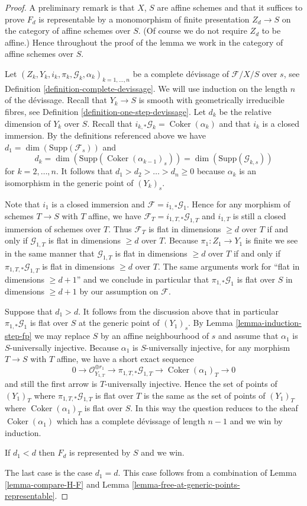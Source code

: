 \documentclass[10pt,a4paper]{amsart}
\theoremstyle{plain}
\theoremstyle{definition}
\theoremstyle{remark}
\numberwithin{equation}{subsection}
\def\Coker{\mathop{\mathrm{Coker}}}
\begin{document}
\begin{proof}
A preliminary remark is that $X$, $S$ are affine schemes and that it
suffices to prove $F_d$ is representable by a monomorphism of finite
presentation $Z_d \to S$ on the category of affine schemes over $S$.
(Of course we do not require $Z_d$ to be affine.)
Hence throughout the proof of
the lemma we work in the category of affine schemes over $S$.

\medskip\noindent
Let $(Z_k, Y_k, i_k, \pi_k, \mathcal{G}_k, \alpha_k)_{k = 1, \ldots, n}$
be a complete d\'evissage of $\mathcal{F}/X/S$ over $s$, see
Definition \ref{definition-complete-devissage}.
We will use induction on the length $n$ of the d\'evissage.
Recall that $Y_k \to S$ is smooth with geometrically irreducible fibres, see
Definition \ref{definition-one-step-devissage}.
Let $d_k$ be the relative dimension of $Y_k$ over $S$.
Recall that $i_{k, *}\mathcal{G}_k = \Coker(\alpha_k)$ and
that $i_k$ is a closed immersion.
By the definitions referenced above we have
$d_1 = \dim(\text{Supp}(\mathcal{F}_s))$ and
$$
d_k = \dim(\text{Supp}(\Coker(\alpha_{k - 1})_s))
= \dim(\text{Supp}(\mathcal{G}_{k, s}))
$$
for $k = 2, \ldots, n$. It follows that $d_1 > d_2 > \ldots > d_n \geq 0$
because $\alpha_k$ is an isomorphism in the generic point of $(Y_k)_s$.

\medskip\noindent
Note that $i_1$ is a closed immersion and
$\mathcal{F} = i_{1, *}\mathcal{G}_1$.
Hence for any morphism of schemes $T \to S$ with $T$ affine,
we have $\mathcal{F}_T = i_{1, T, *}\mathcal{G}_{1, T}$ and
$i_{1, T}$ is still a closed immersion of schemes over $T$.
Thus $\mathcal{F}_T$ is flat in dimensions $\geq d$ over $T$
if and only if $\mathcal{G}_{1, T}$ is flat in dimensions $\geq d$ over $T$.
Because $\pi_1 : Z_1 \to Y_1$ is finite we see in the same manner that
$\mathcal{G}_{1, T}$ is flat in dimensions $\geq d$ over $T$
if and only if $\pi_{1, T, *}\mathcal{G}_{1, T}$ is flat in dimensions
$\geq d$ over $T$. The same arguments work for
``flat in dimensions $\geq d + 1$'' and we conclude in particular that
$\pi_{1, *}\mathcal{G}_1$ is flat over $S$ in dimensions $\geq d + 1$
by our assumption on $\mathcal{F}$.

\medskip\noindent
Suppose that $d_1 > d$. It follows from the discussion above that
in particular $\pi_{1, *}\mathcal{G}_1$ is flat over $S$ at
the generic point of $(Y_1)_s$. By
Lemma \ref{lemma-induction-step-fp}
we may replace $S$ by an affine neighbourhood of $s$ and assume that
$\alpha_1$ is $S$-universally injective. Because $\alpha_1$ is
$S$-universally injective, for any morphism $T \to S$ with $T$ affine,
we have a short exact sequence
$$
0 \to \mathcal{O}_{Y_{1, T}}^{\oplus r_1}
\to \pi_{1, T, *}\mathcal{G}_{1, T} \to \Coker(\alpha_1)_T \to 0
$$
and still the first arrow is $T$-universally injective. Hence the set
of points of $(Y_1)_T$ where $\pi_{1, T, *}\mathcal{G}_{1, T}$ is flat over
$T$ is the same as the set of points of $(Y_1)_T$ where
$\Coker(\alpha_1)_T$ is flat over $S$. In this way the question
reduces to the sheaf $\Coker(\alpha_1)$ which has a complete
d\'evissage of length $n - 1$ and we win by induction.

\medskip\noindent
If $d_1 < d$ then $F_d$ is represented by $S$ and we win.

\medskip\noindent
The last case is the case $d_1 = d$. This case follows from a combination of
Lemma \ref{lemma-compare-H-F}
and
Lemma \ref{lemma-free-at-generic-points-representable}.
\end{proof}
\end{document}
